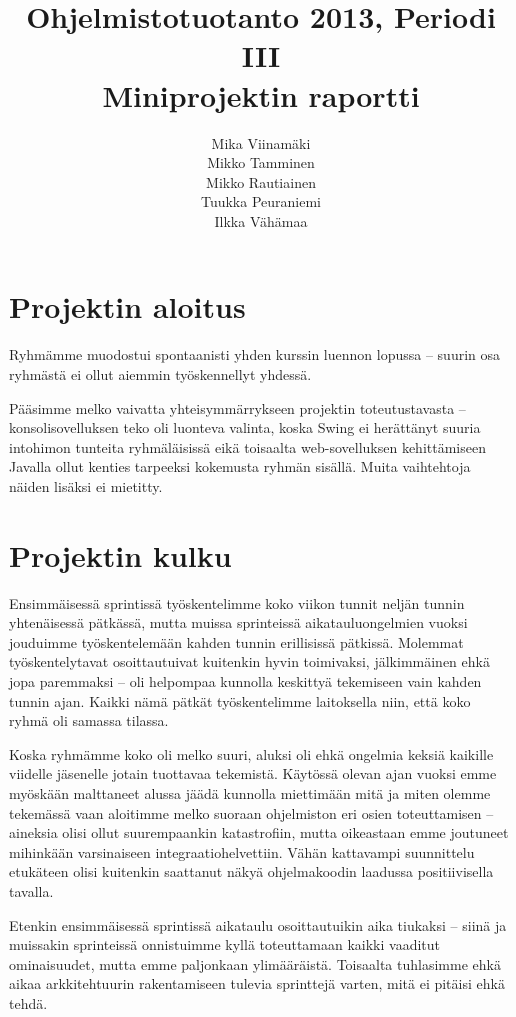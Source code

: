 \documentclass{article}
\title{Ohjelmistotuotanto 2013, Periodi III \\ Miniprojektin raportti}
\author{Mika Viinamäki \\ Mikko Tamminen \\ Mikko Rautiainen \\ Tuukka Peuraniemi \\ Ilkka Vähämaa}
\begin{document}
\begin{titlepage}
\maketitle
\end{titlepage}

\section{Projektin aloitus}

Ryhmämme muodostui spontaanisti yhden kurssin luennon lopussa -- suurin osa ryhmästä ei ollut aiemmin työskennellyt yhdessä.

Pääsimme melko vaivatta yhteisymmärrykseen projektin toteutustavasta -- konsolisovelluksen teko oli luonteva valinta, koska Swing ei herättänyt suuria intohimon tunteita ryhmäläisissä eikä toisaalta web-sovelluksen kehittämiseen Javalla ollut kenties tarpeeksi kokemusta ryhmän sisällä. Muita vaihtehtoja näiden lisäksi ei mietitty.

\section{Projektin kulku}

Ensimmäisessä sprintissä työskentelimme koko viikon tunnit neljän tunnin yhtenäisessä pätkässä, mutta muissa sprinteissä aikatauluongelmien vuoksi jouduimme työskentelemään kahden tunnin erillisissä pätkissä. Molemmat työskentelytavat osoittautuivat kuitenkin hyvin toimivaksi, jälkimmäinen ehkä jopa paremmaksi -- oli helpompaa kunnolla keskittyä tekemiseen vain kahden tunnin ajan. Kaikki nämä pätkät työskentelimme laitoksella niin, että koko ryhmä oli samassa tilassa.

Koska ryhmämme koko oli melko suuri, aluksi oli ehkä ongelmia keksiä kaikille viidelle jäsenelle jotain tuottavaa tekemistä. Käytössä olevan ajan vuoksi emme myöskään malttaneet alussa jäädä kunnolla miettimään mitä ja miten olemme tekemässä vaan aloitimme melko suoraan ohjelmiston eri osien toteuttamisen -- aineksia olisi ollut suurempaankin katastrofiin, mutta oikeastaan emme joutuneet mihinkään varsinaiseen integraatiohelvettiin. Vähän kattavampi suunnittelu etukäteen olisi kuitenkin saattanut näkyä ohjelmakoodin laadussa positiivisella tavalla.

Etenkin ensimmäisessä sprintissä aikataulu osoittautuikin aika tiukaksi -- siinä ja muissakin sprinteissä onnistuimme kyllä toteuttamaan kaikki vaaditut ominaisuudet, mutta emme paljonkaan ylimääräistä. Toisaalta tuhlasimme ehkä aikaa arkkitehtuurin rakentamiseen tulevia sprinttejä varten, mitä ei pitäisi ehkä tehdä.
\end{document}
